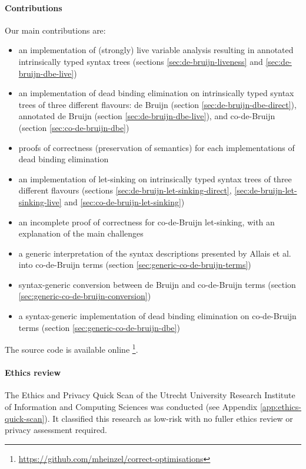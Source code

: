   \paragraph{Contributions}
    Our main contributions are:
    \begin{itemize}
      \item an implementation of (strongly) live variable analysis resulting in annotated intrinsically typed syntax trees
        (sections \ref{sec:de-bruijn-liveness} and \ref{sec:de-bruijn-dbe-live})
      \item an implementation of dead binding elimination on intrinsically typed syntax trees of three different flavours:
        de Bruijn (section \ref{sec:de-bruijn-dbe-direct}),
        annotated de Bruijn (section \ref{sec:de-bruijn-dbe-live}),
        and co-de-Bruijn (section \ref{sec:co-de-bruijn-dbe})
      \item proofs of correctness (preservation of semantics) for each implementations of dead binding elimination
      \item an implementation of let-sinking on intrinsically typed syntax trees of three different flavours
        (sections \ref{sec:de-bruijn-let-sinking-direct}, \ref{sec:de-bruijn-let-sinking-live} and \ref{sec:co-de-bruijn-let-sinking})
      \item an incomplete proof of correctness for co-de-Bruijn let-sinking, with an explanation of the main challenges
      \item a generic interpretation of the syntax descriptions presented by Allais et al. \cite{Allais2018UniverseOfSyntaxes} into co-de-Bruijn terms
        (section \ref{sec:generic-co-de-bruijn-terms})
      \item syntax-generic conversion between de Bruijn and co-de-Bruijn terms
        (section \ref{sec:generic-co-de-bruijn-conversion})
      \item a syntax-generic implementation of dead binding elimination on co-de-Bruijn terms
        (section \ref{sec:generic-co-de-bruijn-dbe})
    \end{itemize}
    The source code is available online%
    \footnote{\url{https://github.com/mheinzel/correct-optimisations}}.

  \paragraph{Ethics review}
    The Ethics and Privacy Quick Scan of the Utrecht University Research Institute of Information and Computing Sciences was conducted (see Appendix \ref{app:ethics-quick-scan}).
    It classified this research as low-risk with no fuller ethics review or privacy assessment required.
